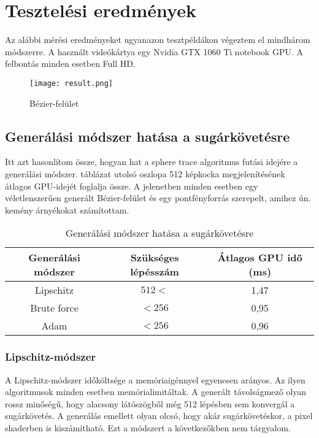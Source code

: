 \chapter{Tesztelési eredmények}

Az alábbi mérési eredményeket ugyanazon tesztpéldákon végeztem el mindhárom módszerre. A használt videókártya egy Nvidia GTX 1060 Ti notebook GPU. A felbontás minden esetben Full HD.

\begin{figure}[H]
	\centering
	\texttt{[image: result.png]}
	\caption{Bézier-felület}
	\label{img:bezSurf}
\end{figure}

\section{Generálási módszer hatása a sugárkövetésre}

Itt azt hasonlítom össze, hogyan hat a sphere trace algoritmus futási idejére a generálási módszer.  táblázat utolsó oszlopa 512 képkocka megjelenítésének átlagos GPU-idejét foglalja össze. A jelenetben minden esetben egy véletlenszerűen generált Bézier-felület és egy pontfényforrás szerepelt, amihez ún. kemény árnyékokat számítottam.

\begin{table}[H]
	\begin{center}
		\begin{tabular}{| c || c | c |}
			\hline
			\textbf{Generálási módszer} & \textbf{Szükséges lépésszám} & \textbf{Átlagos GPU idő (ms)} \\ 
			\hline\hline
			Lipschitz & $512<$ & 1,47 \\
			\hline
			Brute force & $<256$ & 0,95 \\
			\hline
			Adam & $<256$ & 0,96 \\
			\hline
		\end{tabular}
	\end{center}
	\caption{Generálási módszer hatása a sugárkövetésre}
	\label{tab:trace}
\end{table}

\subsection{Lipschitz-módszer}
A Lipschitz-módszer időköltsége a memóriaigénnyel egyenesen arányos. Az ilyen algoritmusok minden esetben memórialimitáltak. A generált távolságmező olyan rossz minőségű, hogy alacsony látószögből még 512 lépésben sem konvergál a sugárkövetés. A generálás emellett olyan olcsó, hogy akár sugárkövetéskor, a pixel shaderben is kiszámítható. Ezt a módszert a következőkben nem tárgyalom.

